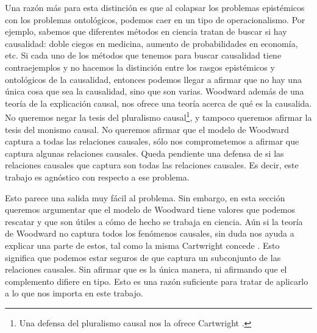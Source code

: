 Una razón más para esta distinción es que al colapsar los problemas epistémicos con los problemas ontológicos, podemos caer en un tipo de operacionalismo. Por ejemplo, sabemos que diferentes métodos en ciencia tratan de buscar si hay causalidad: doble ciegos en medicina, aumento de probabilidades en economía, etc. Si cada uno de los métodos que tenemos para buscar causalidad tiene contraejemplos y no hacemos la distinción entre los rasgos epistémicos y ontológicos de la causalidad, entonces podemos llegar a afirmar que no hay una única cosa que sea la causalidad, sino que son varias. Woodward además de una teoría de la explicación causal, nos ofrece una teoría acerca de qué es la causalida. No queremos negar la tesis del pluralismo causal\footnote{Una defensa del pluralismo causal nos la ofrece Cartwright \citeyear{Cartwright2007}.}, y tampoco queremos afirmar la tesis del monismo causal. No queremos afirmar que el modelo de Woodward captura a todas las relaciones causales, sólo nos comprometemos a afirmar que captura algunas relaciones causales. Queda pendiente una defensa de si las relaciones causales que captura son todas las relaciones causales. Es decir, este trabajo es agnóstico con respecto a ese problema.

Esto parece una salida muy fácil al problema. Sin embargo, en esta sección queremos argumentar que el modelo de Woodward tiene valores que podemos rescatar y que son útiles a cómo de hecho se trabaja en ciencia. Aún si la teoría de Woodward no captura todos los fenómenos causales, sin duda nos ayuda a explicar una parte de estos, tal como la misma Cartwright concede \citeyear[cap. 7]{Cartwright2007}. Esto significa que podemos estar seguros de que captura un subconjunto de las relaciones causales. Sin afirmar que es la única manera, ni afirmando que el complemento difiere en tipo. Esto es una razón suficiente para tratar de aplicarlo a lo que nos importa en este trabajo.


